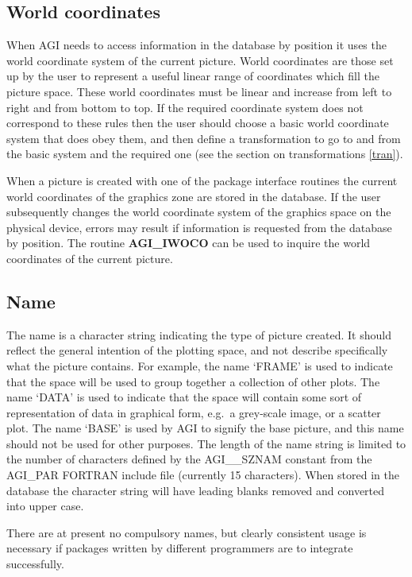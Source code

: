 \subsection{World coordinates}
When AGI needs to access information in the database by position it uses the
world coordinate system of the current picture.
World coordinates are those set up by the user to represent a useful linear
range of coordinates which fill the picture space.
These world coordinates must be linear and increase from left to right
and from bottom to top. If the required coordinate system does not correspond
to these rules then the user should choose a basic world coordinate system
that does obey them, and then define a transformation to go to and from
the basic system and the required one (see the section on transformations
\ref{tran}).

When a picture is created with one of the package interface routines the
current world coordinates of the graphics zone are stored in the database.
If the user subsequently changes the world coordinate system of the graphics
space on the physical device, errors may result if information is requested
from the database by position.
The routine {\bf AGI\_IWOCO} can be used to inquire the world coordinates
of the current picture.

\subsection{Name}
The name is a character string indicating the type of picture created.
It should reflect the general intention of the plotting space, and not
describe specifically what the picture contains.
For example, the name `FRAME' is used to indicate that the space will be used
to group together a collection of other plots.
The name `DATA' is used to indicate that the space will contain some sort of
representation of data in graphical form, e.g.\ a grey-scale image, or a
scatter plot.
The name `BASE' is used by AGI to signify the base picture, and this name
should not be used for other purposes.
The length of the name string is limited to the number of characters defined
by the AGI\_\_SZNAM constant from the AGI\_PAR FORTRAN include file
(currently 15 characters).
When stored in the database the character string will have leading blanks
removed and converted into upper case.

There are at present no compulsory names, but clearly consistent usage is
necessary if packages written by different programmers are to integrate
successfully.

